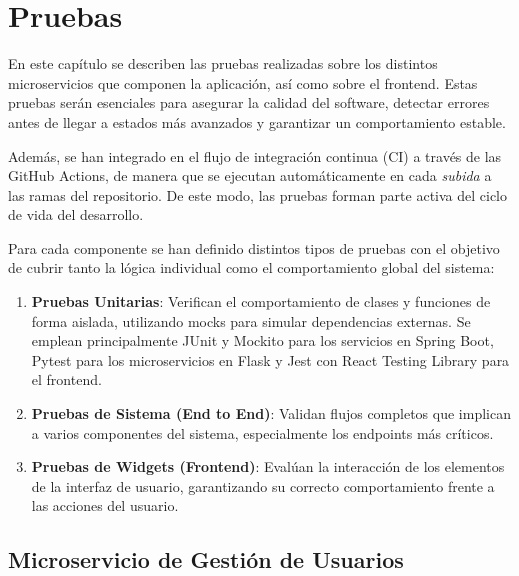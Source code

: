 \chapter{Pruebas} \label{pruebas}

En este capítulo se describen las pruebas realizadas sobre los distintos microservicios que componen la aplicación, así como sobre el frontend. Estas pruebas serán esenciales para asegurar la calidad del software, detectar errores antes de llegar a estados más avanzados y garantizar un comportamiento estable. 

Además, se han integrado en el flujo de integración continua (CI) a través de las GitHub Actions, de manera que se ejecutan automáticamente en cada \textit{subida} a las ramas del repositorio. De este modo, las pruebas forman parte activa del ciclo de vida del desarrollo.

\vspace{0.5em}

Para cada componente se han definido distintos tipos de pruebas con el objetivo de cubrir tanto la lógica individual como el comportamiento global del sistema:

\begin{enumerate}
    \item \textbf{Pruebas Unitarias}: Verifican el comportamiento de clases y funciones de forma aislada, utilizando mocks para simular dependencias externas. Se emplean principalmente JUnit y Mockito para los servicios en Spring Boot, Pytest para los microservicios en Flask y Jest \cite{Jest} con React Testing Library para el frontend.
    
    \item \textbf{Pruebas de Sistema (End to End)}: Validan flujos completos que implican a varios componentes del sistema, especialmente los endpoints más críticos.
    
    \item \textbf{Pruebas de Widgets (Frontend)}: Evalúan la interacción de los elementos de la interfaz de usuario, garantizando su correcto comportamiento frente a las acciones del usuario.
\end{enumerate}

\section{Microservicio de Gestión de Usuarios}

